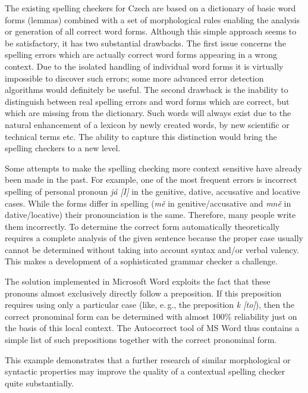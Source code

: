 \begin{multicols}{2}
The existing spelling checkers for Czech are based on a dictionary of basic word forms (lemmas) combined with a set of morphological rules enabling the analysis or generation of all correct word forms. Although this simple approach seems to be satisfactory, it has two substantial drawbacks. The first issue concerns the spelling errors which are actually correct word forms appearing in a wrong context. Due to the isolated handling of individual word forms it is virtually impossible to discover such errors; some more advanced error detection algorithms would definitely be useful. The second drawback is the inability to distinguish between real spelling errors and word forms which are correct, but which are missing from the dictionary. Such words will always exist due to the natural enhancement of a lexicon by newly created words, by new scientific or technical terms etc. The ability to capture this distinction would bring the spelling checkers to a new level.

Some attempts to make the spelling checking more context sensitive have already been made in the past. For example, one of the most frequent errors is incorrect spelling of personal pronoun \textit{já {[}I{]}} in the genitive, dative, accusative and locative cases. While the forms differ in spelling (\textit{mě} in genitive/accusative and \textit{mně} in dative/locative) their pronounciation is the same. Therefore,  many people write them incorrectly. To determine the correct form automatically theoretically requires a complete analysis of the given sentence because the proper case usually cannot be determined without taking into account syntax and/or verbal valency. This makes a development of a sophisticated grammar checker a challenge.

The solution implemented in Microsoft Word exploits the fact that these pronouns almost exclusively directly follow a preposition. If this preposition requires using only a particular case (like, e.\,g., the preposition \textit{k {[}to{]}}), then the correct pronominal form can be determined with almost 100\% reliability just on the basis of this local context. The Autocorrect tool of MS Word thus contains a simple list of such prepositions together with the correct pronominal form.

This example demonstrates that a further research of similar morphological or syntactic properties may improve the quality of a contextual spelling checker quite substantially.


\end{multicols}
